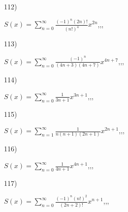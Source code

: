 \documentclass[11pt, ukrainian]{article}
\begin{document}
\par
\vspace{0.9cm}
112) \space 
{%
{$S(x)=\sum\limits_{n=0}^{\infty}{\frac{{(-1)^n}(2n)!}{(n!)^4}}{x^{{2n}}}$},,, \par \smallskip  
}
\par
\vspace{0.9cm}
113) \space 
{%
{$S(x)=\sum\limits_{n=0}^{\infty}{\frac{(-1)^n}{(4n+3)(4n+7)}}{x^{{4n+7}}}$},,, \par \smallskip  
}
\par
\vspace{0.9cm}
114) \space 
{%
{$S(x)=\sum\limits_{n=0}^{\infty}{\frac{1}{3n+1}}{x^{{3n+1}}}$},,, \par \smallskip  
}
\par
\vspace{0.9cm}
115) \space 
{%
{$S(x)=\sum\limits_{n=1}^{\infty}{\frac{1}{n(n+1)(2n+1)}}{x^{{2n+1}}}$},,, \par \smallskip  
}
\par
\vspace{0.9cm}
116) \space 
{%
{$S(x)=\sum\limits_{n=0}^{\infty}{\frac{1}{4n+1}}{x^{{4n+1}}}$},,, \par \smallskip  
}
\par
\vspace{0.9cm}
117) \space 
{%
{$S(x)=\sum\limits_{n=0}^{\infty}{\frac{{(-1)^n}{(n!)^2}}{(2n+2)!}}{x^{{n+1}}}$},,, \par \smallskip  
}
\end{document}
